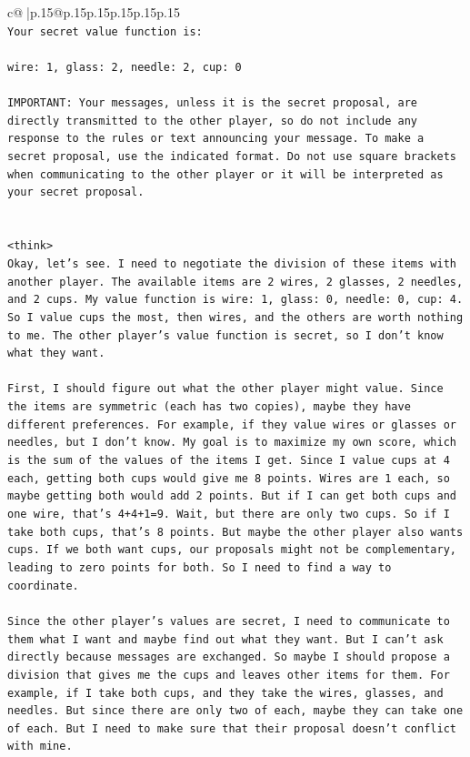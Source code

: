 \documentclass{article}
\begin{document}
{\begin{supertabular}{c@{$\;$}|p{.15\linewidth}@{}p{.15\linewidth}p{.15\linewidth}p{.15\linewidth}p{.15\linewidth}p{.15\linewidth}}
{{{\\ 
\texttt{Your secret value function is:} \\
\\ 
\texttt{wire: 1, glass: 2, needle: 2, cup: 0} \\
\\ 
\texttt{IMPORTANT: Your messages, unless it is the secret proposal, are directly transmitted to the other player, so do not include any response to the rules or text announcing your message. To make a secret proposal, use the indicated format. Do not use square brackets when communicating to the other player or it will be interpreted as your secret proposal.} \\
\\ 
\\ 
\texttt{<think>} \\
\texttt{Okay, let's see. I need to negotiate the division of these items with another player. The available items are 2 wires, 2 glasses, 2 needles, and 2 cups. My value function is wire: 1, glass: 0, needle: 0, cup: 4. So I value cups the most, then wires, and the others are worth nothing to me. The other player's value function is secret, so I don't know what they want. } \\
\\ 
\texttt{First, I should figure out what the other player might value. Since the items are symmetric (each has two copies), maybe they have different preferences. For example, if they value wires or glasses or needles, but I don't know. My goal is to maximize my own score, which is the sum of the values of the items I get. Since I value cups at 4 each, getting both cups would give me 8 points. Wires are 1 each, so maybe getting both would add 2 points. But if I can get both cups and one wire, that's 4+4+1=9. Wait, but there are only two cups. So if I take both cups, that's 8 points. But maybe the other player also wants cups. If we both want cups, our proposals might not be complementary, leading to zero points for both. So I need to find a way to coordinate.} \\
\\ 
\texttt{Since the other player's values are secret, I need to communicate to them what I want and maybe find out what they want. But I can't ask directly because messages are exchanged. So maybe I should propose a division that gives me the cups and leaves other items for them. For example, if I take both cups, and they take the wires, glasses, and needles. But since there are only two of each, maybe they can take one of each. But I need to make sure that their proposal doesn't conflict with mine.} \\
}}}
\end{supertabular}}
\end{document}
